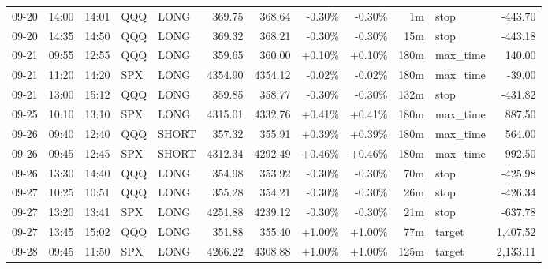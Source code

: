 \documentclass[11pt,a4paper,twoside]{article}
\begin{document}
\begin{center}
\begin{longtable}{>{\color{txtmain}}l l l l l r r r r r >{\color{txtmain}}l r}
09-20 & 14:00 & 14:01 & QQQ & LONG & 369.75 & 368.64 & \textcolor{lossred}{-0.30\%} & \textcolor{lossred}{-0.30\%} & 1m & stop & \textcolor{lossred}{-443.70} \\
09-20 & 14:35 & 14:50 & QQQ & LONG & 369.32 & 368.21 & \textcolor{lossred}{-0.30\%} & \textcolor{lossred}{-0.30\%} & 15m & stop & \textcolor{lossred}{-443.18} \\
09-21 & 09:55 & 12:55 & QQQ & LONG & 359.65 & 360.00 & \textcolor{wingreen}{+0.10\%} & \textcolor{wingreen}{+0.10\%} & 180m & max\_time & \textcolor{wingreen}{140.00} \\
09-21 & 11:20 & 14:20 & SPX & LONG & 4354.90 & 4354.12 & \textcolor{lossred}{-0.02\%} & \textcolor{lossred}{-0.02\%} & 180m & max\_time & \textcolor{lossred}{-39.00} \\
09-21 & 13:00 & 15:12 & QQQ & LONG & 359.85 & 358.77 & \textcolor{lossred}{-0.30\%} & \textcolor{lossred}{-0.30\%} & 132m & stop & \textcolor{lossred}{-431.82} \\
09-25 & 10:10 & 13:10 & SPX & LONG & 4315.01 & 4332.76 & \textcolor{wingreen}{+0.41\%} & \textcolor{wingreen}{+0.41\%} & 180m & max\_time & \textcolor{wingreen}{887.50} \\
09-26 & 09:40 & 12:40 & QQQ & SHORT & 357.32 & 355.91 & \textcolor{wingreen}{+0.39\%} & \textcolor{wingreen}{+0.39\%} & 180m & max\_time & \textcolor{wingreen}{564.00} \\
09-26 & 09:45 & 12:45 & SPX & SHORT & 4312.34 & 4292.49 & \textcolor{wingreen}{+0.46\%} & \textcolor{wingreen}{+0.46\%} & 180m & max\_time & \textcolor{wingreen}{992.50} \\
09-26 & 13:30 & 14:40 & QQQ & LONG & 354.98 & 353.92 & \textcolor{lossred}{-0.30\%} & \textcolor{lossred}{-0.30\%} & 70m & stop & \textcolor{lossred}{-425.98} \\
09-27 & 10:25 & 10:51 & QQQ & LONG & 355.28 & 354.21 & \textcolor{lossred}{-0.30\%} & \textcolor{lossred}{-0.30\%} & 26m & stop & \textcolor{lossred}{-426.34} \\
09-27 & 13:20 & 13:41 & SPX & LONG & 4251.88 & 4239.12 & \textcolor{lossred}{-0.30\%} & \textcolor{lossred}{-0.30\%} & 21m & stop & \textcolor{lossred}{-637.78} \\
09-27 & 13:45 & 15:02 & QQQ & LONG & 351.88 & 355.40 & \textcolor{wingreen}{+1.00\%} & \textcolor{wingreen}{+1.00\%} & 77m & target & \textcolor{wingreen}{1,407.52} \\
09-28 & 09:45 & 11:50 & SPX & LONG & 4266.22 & 4308.88 & \textcolor{wingreen}{+1.00\%} & \textcolor{wingreen}{+1.00\%} & 125m & target & \textcolor{wingreen}{2,133.11} \\

\end{longtable}
\end{center}
\end{document}
